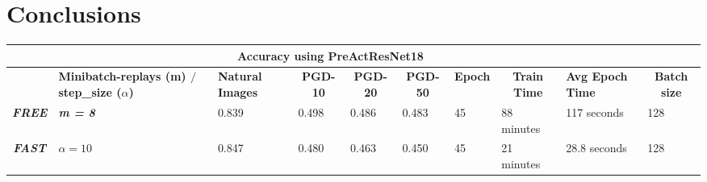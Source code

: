 \documentclass{article}
\begin{document}
\section{Conclusions}


\begin{table}[]
\begin{tabular}{|l|p{2.5cm}|l|l|l|l|l|l|l|l|}
\hline
                                             & \multicolumn{1}{l|}{}      & \multicolumn{4}{c|}{\textbf{Accuracy using PreActResNet18}}                                                                                                       & \multicolumn{3}{l|}{}                                                                                                                 &                                          \\ \hline
                                    & \textbf{Minibatch-replays (m) $/$step\_size ($\alpha$)} & \multicolumn{1}{p{1.5cm}|}{\textbf{Natural Images}} & \multicolumn{1}{c|}{\textbf{PGD-10}} & \multicolumn{1}{c|}{\textbf{PGD-20}} & \multicolumn{1}{c|}{\textbf{PGD-50}} & \multicolumn{1}{c|}{\textbf{Epoch}} & \multicolumn{1}{c|}{\textbf{Train Time}}                  & \multicolumn{1}{p{1.5cm}|}{\textbf{Avg Epoch Time}} & \multicolumn{1}{c|}{\textbf{Batch size}} \\ \hline
\multicolumn{1}{|c|}{\textit{\textbf{FREE}}} & \textit{\textbf{m = 8}}             & { 0.839}                 & { 0.498}         & { 0.486}         & { 0.483}         & { 45}           & { 88 minutes}                         & 117 seconds                                  & 128                                      \\ \hline
\multicolumn{1}{|c|}{\textit{\textbf{FAST}}} & $\alpha = 10$                    & { 0.847}                 & { 0.480}         & { 0.463}         & { 0.450}         & { 45}           &  21 minutes & 28.8 seconds                                 & 128                                      \\ \hline
\end{tabular}
\end{table}
\end{document}
